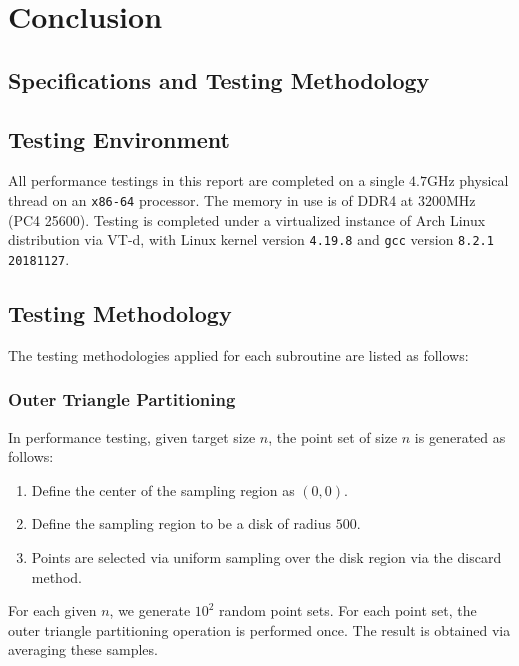 \documentclass{article}
\begin{document}
\section{Conclusion}




\begin{appendices}
    \section{Specifications and Testing Methodology} \label{apdxSpecs}

    \subsection{Testing Environment}

    All performance testings in this report are completed on a single $4.7$GHz physical thread on an \texttt{x86-64} processor. The memory in use is of DDR4 at $3200$MHz (PC4 25600). Testing is completed under a virtualized instance of Arch Linux distribution via VT-d, with Linux kernel version \texttt{4.19.8} and \texttt{gcc} version \texttt{8.2.1 20181127}.

    \subsection{Testing Methodology}

    The testing methodologies applied for each subroutine are listed as follows:

    \subsubsection{Outer Triangle Partitioning}

    In performance testing, given target size $n$, the point set of size $n$ is generated as follows:
    \begin{enumerate}
        \item Define the center of the sampling region as $(0, 0)$.
        \item Define the sampling region to be a disk of radius $500$.
        \item Points are selected via uniform sampling over the disk region via the discard method.
    \end{enumerate}
    For each given $n$, we generate $10^2$ random point sets. For each point set, the outer triangle partitioning operation is performed once. The result is obtained via averaging these samples.


\end{appendices}
\end{document}
